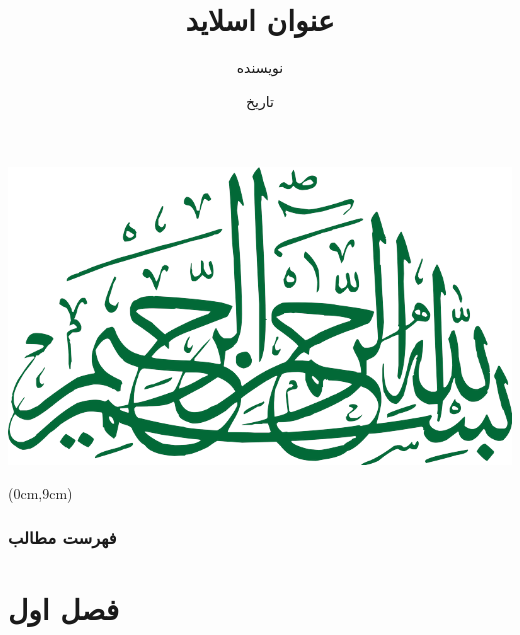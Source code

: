 

\title{عنوان اسلاید}
\author{نویسنده}
\date{تاریخ}




\begin{frame}
\includegraphics[width=7 cm]{assets/Besmellah.jpg}
\begin{textblock*}{13cm}(0cm,9cm)
\crule[white]{13cm}{1cm}
\end{textblock*}
\end{frame}



\begin{frame}
\maketitle
\end{frame}
\begin{frame}
\frametitle{فهرست مطالب}
\hfill
\parbox[t]{.95\textwidth}{
{
\setcounter{tocdepth}{1} 
\tableofcontents
}
}
\end{frame}



\section{فصل اول}


